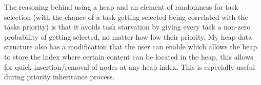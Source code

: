 \documentclass[12pt,a4paper]{article}
\begin{document}
The reasoning behind using a heap and an element of randomness for task selection (with the chance of a task getting selected being correlated with the tasks priority) is that it avoids task starvation by giving every task a non-zero probability of getting selected, no matter how low their priority. My heap data structure also has a modification that the user can enable which allows the heap to store the index where certain content can be located in the heap, this allows for quick insertion/removal of nodes at any heap index. This is especially useful during priority inheritance process. 





\end{document}
